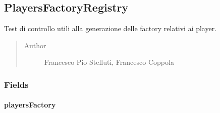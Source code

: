 \documentclass[letterpaper,10pt,italian,openany,oneside]{sphinxmanual}
\begin{document}
\subsection{PlayersFactoryRegistry}
\label{\detokenize{test/it/unicam/cs/pa/mastermind/test/PlayersFactoryRegistry:playersfactoryregistry}}\label{\detokenize{test/it/unicam/cs/pa/mastermind/test/PlayersFactoryRegistry::doc}}

\begin{fulllineitems}
\label{\detokenize{test/it/unicam/cs/pa/mastermind/test/PlayersFactoryRegistry:it.unicam.cs.pa.mastermind.test.PlayersFactoryRegistry}}
Test di controllo utili alla generazione delle factory relativi ai player.
\begin{quote}\begin{description}
\item[{Author}] \leavevmode
Francesco Pio Stelluti, Francesco Coppola

\end{description}\end{quote}

\end{fulllineitems}



\subsubsection{Fields}
\label{\detokenize{test/it/unicam/cs/pa/mastermind/test/PlayersFactoryRegistry:fields}}

\paragraph{playersFactory}
\label{\detokenize{test/it/unicam/cs/pa/mastermind/test/PlayersFactoryRegistry:playersfactory}}

\begin{fulllineitems}
\label{\detokenize{test/it/unicam/cs/pa/mastermind/test/PlayersFactoryRegistry:it.unicam.cs.pa.mastermind.test.PlayersFactoryRegistry.playersFactory}}
\end{fulllineitems}
\end{document}
